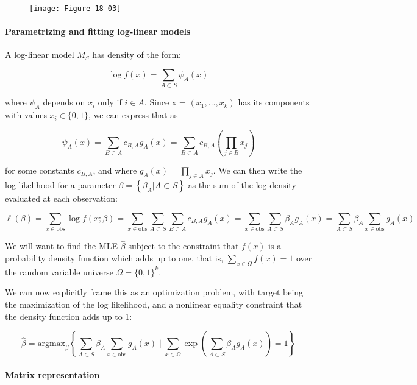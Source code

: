 \begin{figure}[H]
\centering
\texttt{[image: Figure-18-03]}
\end{figure}

\paragraph{Parametrizing and fitting log-linear models}\label{parametrizing-and-fitting-log-linear-models}

A log-linear model \(M_S\) has density of the form:

\[ \log f(x) = \sum_{A \subset S} \psi_A(x) \]

where \(\psi_A\) depends on \(x_{i}\) only if \(i \in A\). Since x =
\((x_{1}, \dots, x_{k})\) has its components with values
\(x_{i} \in \{ 0, 1 \}\), we can express that as

\[ \psi_A(x) = \sum_{B \subset A} c_{B, A} g_A(x) = \sum_{B \subset A} c_{B, A} \left( \prod_{j \in B} x_{j} \right) \]

for some constants \(c_{B, A}\), and where
\(g_A(x) = \prod_{j \in A} x_{j}\). We can then write the log-likelihood
for a parameter \(\beta = \left\{ \beta_A | A \subset S \right\}\) as
the sum of the log density evaluated at each observation:

\[ \ell(\beta) = \sum_{x \in \text{obs}} \log f(x; \beta) =  \sum_{x \in \text{obs}} \sum_{A \subset S} \sum_{B \subset A} c_{B, A} g_A(x) = \sum_{x \in \text{obs}} \sum_{A \subset S} \beta_A g_A(x) = \sum_{A \subset S} \beta_A \sum_{x \in \text{obs}} g_A(x) \]

We will want to find the MLE \(\hat{\beta}\) subject to the constraint
that \(f(x)\) is a probability density function which adds up to one,
that is, \(\sum_{x \in \Omega} f(x) = 1\) over the random variable
universe \(\Omega = \{ 0, 1 \}^{k}\).

We can now explicitly frame this as an optimization problem, with target
being the maximization of the log likelihood, and a nonlinear equality
constraint that the density function adds up to 1:

\[
\hat{\beta} = \text{argmax}_\beta \left\{ \sum_{A \subset S} \beta_A \sum_{x \in \text{obs}} g_A(x) 
\;\Bigg|\;  \sum_{x \in \Omega} \exp \left( \sum_{A \subset S} \beta_A g_A(x) \right) = 1
\right\}
\]

\paragraph{Matrix representation}\label{matrix-representation}

